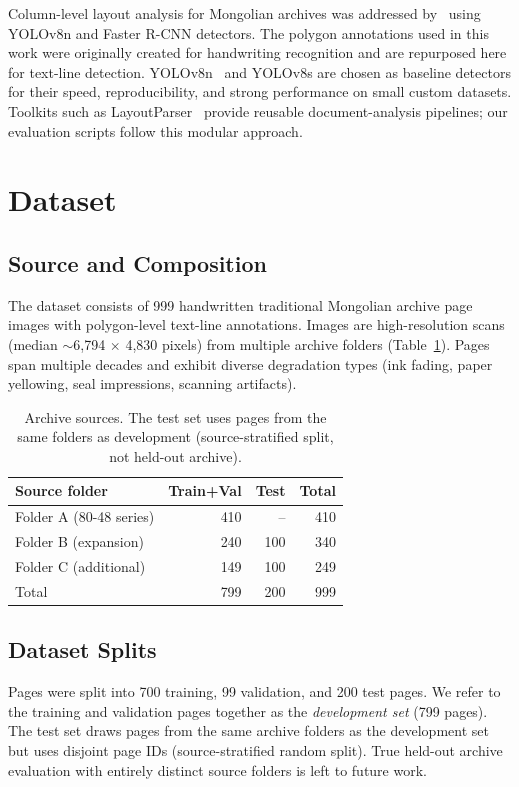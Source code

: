 \documentclass[pdflatex,sn-mathphys-num]{sn-jnl}
\begin{document}
Column-level layout analysis for Mongolian archives was addressed by~\cite{liang2025pilot} using YOLOv8n and Faster R-CNN detectors. The polygon annotations used in this work were originally created for handwriting recognition and are repurposed here for text-line detection. YOLOv8n~\cite{jocher2023yolov8} and YOLOv8s are chosen as baseline detectors for their speed, reproducibility, and strong performance on small custom datasets. Toolkits such as LayoutParser~\cite{shen2021layoutparser} provide reusable document-analysis pipelines; our evaluation scripts follow this modular approach.

\section{Dataset}
\subsection{Source and Composition}
The dataset consists of 999 handwritten traditional Mongolian archive page images with polygon-level text-line annotations. Images are high-resolution scans (median $\sim$6,794 $\times$ 4,830 pixels) from multiple archive folders (Table~\ref{tab:sources}). Pages span multiple decades and exhibit diverse degradation types (ink fading, paper yellowing, seal impressions, scanning artifacts).

\begin{table}[t]
\centering
\scriptsize\setlength{\tabcolsep}{3pt}
\caption{Archive sources. The test set uses pages from the same folders as development (source-stratified split, not held-out archive).}
\label{tab:sources}
\begin{tabular}{lrrr}
\toprule
Source folder & Train+Val & Test & Total \\
\midrule
Folder A (80-48 series) & 410 & -- & 410 \\
Folder B (expansion)     & 240 & 100 & 340 \\
Folder C (additional)     & 149 & 100 & 249 \\
\midrule
Total & 799 & 200 & 999 \\
\bottomrule
\end{tabular}
\end{table}

\subsection{Dataset Splits}
Pages were split into 700 training, 99 validation, and 200 test pages. We refer to the training and validation pages together as the \emph{development set} (799 pages). The test set draws pages from the same archive folders as the development set but uses disjoint page IDs (source-stratified random split). True held-out archive evaluation with entirely distinct source folders is left to future work.
\end{document}
